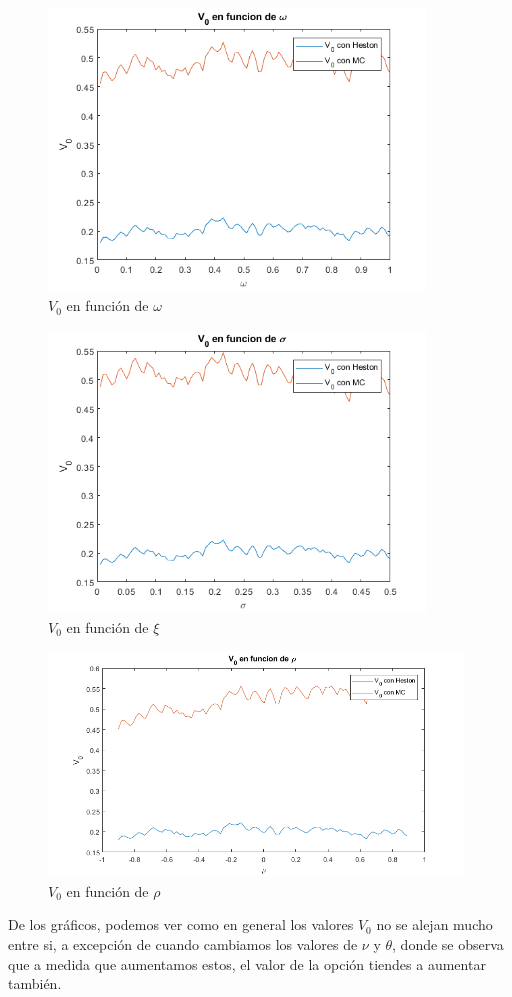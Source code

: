 \begin{figure}[H]
    \begin{center}
    \includegraphics[width = 10cm]{figures/Paso6-3.png}
    \caption{$V_0$ en función de $\omega$}
    \end{center}
\end{figure}

\begin{figure}[H]
    \begin{center}
    \includegraphics[width = 10cm]{figures/Paso6-4.png}
    \caption{$V_0$ en función de $\xi$}
    \end{center}
\end{figure}

\begin{figure}[H]
    \begin{center}
    \includegraphics[width = 11cm]{figures/Paso6-5.png}
    \caption{$V_0$ en función de $\rho$}
    \end{center}
\end{figure}

De los gráficos, podemos ver como en general los valores $V_0$ no se alejan mucho entre si, a excepción de cuando  cambiamos los valores de $\nu$ y $\theta$, donde se observa que a medida que aumentamos estos, el valor de la opción tiendes a aumentar también.
\newpage

